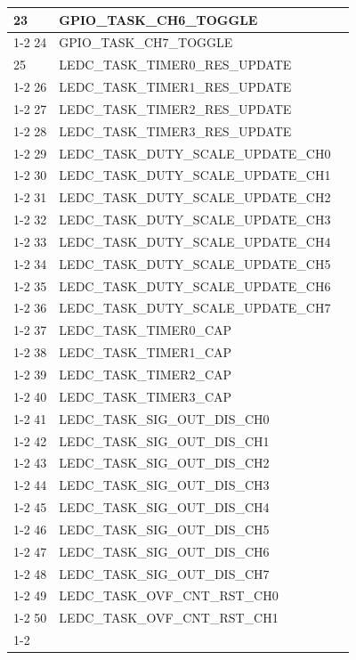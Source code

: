 \documentclass[main\_\_EN.tex]{subfiles}
\begin{document}
\begin{longtable}{ | l | l | l | }
23  & GPIO\_TASK\_CH6\_TOGGLE  &  \\ \cline{1-2}
24  & GPIO\_TASK\_CH7\_TOGGLE  &  \\ \hline
25  & LEDC\_TASK\_TIMER0\_RES\_UPDATE      & \nameref{mod:ledpwm} \\ \cline{1-2}
26  & LEDC\_TASK\_TIMER1\_RES\_UPDATE      & \\ \cline{1-2}
27  & LEDC\_TASK\_TIMER2\_RES\_UPDATE      & \\ \cline{1-2}
28  & LEDC\_TASK\_TIMER3\_RES\_UPDATE      & \\ \cline{1-2}
29  & LEDC\_TASK\_DUTY\_SCALE\_UPDATE\_CH0 & \\ \cline{1-2}
30  & LEDC\_TASK\_DUTY\_SCALE\_UPDATE\_CH1 & \\ \cline{1-2}
31  & LEDC\_TASK\_DUTY\_SCALE\_UPDATE\_CH2 & \\ \cline{1-2}
32  & LEDC\_TASK\_DUTY\_SCALE\_UPDATE\_CH3 & \\ \cline{1-2}
33  & LEDC\_TASK\_DUTY\_SCALE\_UPDATE\_CH4 & \\ \cline{1-2}
34  & LEDC\_TASK\_DUTY\_SCALE\_UPDATE\_CH5 & \\ \cline{1-2}
35  & LEDC\_TASK\_DUTY\_SCALE\_UPDATE\_CH6 & \\ \cline{1-2}
36  & LEDC\_TASK\_DUTY\_SCALE\_UPDATE\_CH7 & \\ \cline{1-2}
37  & LEDC\_TASK\_TIMER0\_CAP  & \\ \cline{1-2}
38  & LEDC\_TASK\_TIMER1\_CAP  & \\ \cline{1-2}
39  & LEDC\_TASK\_TIMER2\_CAP  & \\ \cline{1-2}
40  & LEDC\_TASK\_TIMER3\_CAP  & \\ \cline{1-2}
41  & LEDC\_TASK\_SIG\_OUT\_DIS\_CH0& \\ \cline{1-2}
42  & LEDC\_TASK\_SIG\_OUT\_DIS\_CH1& \\ \cline{1-2}
43  & LEDC\_TASK\_SIG\_OUT\_DIS\_CH2& \\ \cline{1-2}
44  & LEDC\_TASK\_SIG\_OUT\_DIS\_CH3& \\ \cline{1-2}
45  & LEDC\_TASK\_SIG\_OUT\_DIS\_CH4& \\ \cline{1-2}
46  & LEDC\_TASK\_SIG\_OUT\_DIS\_CH5& \\ \cline{1-2}
47  & LEDC\_TASK\_SIG\_OUT\_DIS\_CH6& \\ \cline{1-2}
48  & LEDC\_TASK\_SIG\_OUT\_DIS\_CH7& \\ \cline{1-2}
49  & LEDC\_TASK\_OVF\_CNT\_RST\_CH0& \\ \cline{1-2}
50  & LEDC\_TASK\_OVF\_CNT\_RST\_CH1& \\ \cline{1-2}

\end{longtable}
\end{document}
